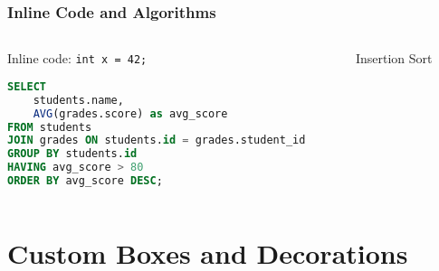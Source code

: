 \documentclass[aspectratio=169,professionalfonts]{beamer}
\begin{document}
\begin{frame}[fragile]
    \frametitle{Inline Code and Algorithms}
    
    \begin{columns}[T]
        \begin{column}{0.48\textwidth}
            Inline code: \lstinline|int x = 42;|
            
            \begin{lstlisting}[language=SQL, caption=SQL Query]
SELECT 
    students.name,
    AVG(grades.score) as avg_score
FROM students
JOIN grades ON students.id = grades.student_id
GROUP BY students.id
HAVING avg_score > 80
ORDER BY avg_score DESC;
            \end{lstlisting}
        \end{column}
        
        \begin{column}{0.48\textwidth}
            \begin{algorithm}[H]
                \SetAlgoLined
                \caption{Insertion Sort}
            \end{algorithm}
        \end{column}
    \end{columns}
\end{frame}

\section{Custom Boxes and Decorations}
\end{document}
